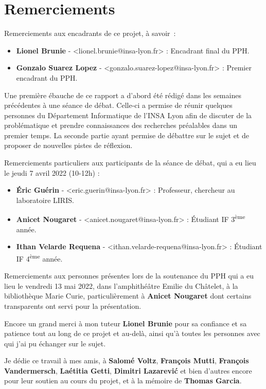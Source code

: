 \documentclass[12pt]{article} %
\newcommand{\ts}{\textsuperscript} %
\begin{document}
\newpage
\section*{Remerciements}
Remerciements aux encadrants de ce projet, à savoir :

\begin{itemize}
    \item \textbf{Lionel Brunie} - <lionel.brunie@insa-lyon.fr> : Encadrant final  du PPH.
    \item \textbf{Gonzalo Suarez Lopez} - <gonzalo.suarez-lopez@insa-lyon.fr> : Premier encadrant du PPH.
\end{itemize}

Une première ébauche de ce rapport a d'abord été rédigé dans les semaines précédentes à une séance de débat. Celle-ci a permise de réunir quelques personnes du Département Informatique de l'INSA Lyon afin de discuter de la problématique et prendre connaissances des recherches préalables dans un premier temps. La seconde partie ayant permise de débattre sur le sujet et de proposer de nouvelles pistes de réflexion. 

Remerciements particuliers aux participants de la séance de débat, qui a eu lieu le jeudi 7 avril 2022 (10-12h) :

\begin{itemize}
    \item \textbf{Éric Guérin} - <eric.guerin@insa-lyon.fr> : Professeur, chercheur au laboratoire LIRIS.
    \item \textbf{Anicet Nougaret} - <anicet.nougaret@insa-lyon.fr> : Étudiant IF 3\ts{ème} année. 
    \item \textbf{Ithan Velarde Requena} - <ithan.velarde-requena@insa-lyon.fr> : Étudiant IF 4\ts{ème} année.
\end{itemize}

Remerciements aux personnes présentes lors de la soutenance du PPH qui a eu lieu le vendredi 13 mai 2022, dans l'amphithéâtre Emilie du Châtelet, à la bibliothèque Marie Curie, particulièrement à \textbf{Anicet Nougaret} dont certains transparents ont servi pour la présentation. 

Encore un grand merci à mon tuteur \textbf{Lionel Brunie} pour sa confiance et sa patience tout au long de ce projet et au-delà, ainsi qu'à toutes les personnes avec qui j'ai pu échanger sur le sujet. 

Je dédie ce travail à mes amis, à \textbf{Salomé Voltz}, \textbf{François Mutti}, \textbf{François Vandermersch}, \textbf{Laétitia Getti}, \textbf{Dimitri Lazarević} et bien d'autres encore pour leur soutien au cours du projet, et à la mémoire de \textbf{Thomas Garcia}.
\end{document}
